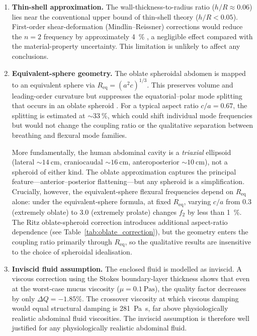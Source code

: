 \begin{enumerate}
  \item \textbf{Thin-shell approximation.}  The wall-thickness-to-radius
    ratio ($h/R \approx 0.06$) lies near the conventional upper bound of
    thin-shell theory ($h/R < 0.05$).  First-order shear-deformation
    (Mindlin--Reissner) corrections would reduce the $n = 2$ frequency by
    approximately \SI{4}{\percent} \cite{Soedel2004}, a negligible effect
    compared with the material-property uncertainty.  This limitation is
    unlikely to affect any conclusions.

  \item \textbf{Equivalent-sphere geometry.}  The oblate spheroidal
    abdomen is mapped to an equivalent sphere via $R_{\mathrm{eq}} =
    (a^2 c)^{1/3}$.  This preserves volume and leading-order curvature
    but suppresses the equatorial--polar mode splitting that occurs in
    an oblate spheroid \cite{Leissa1973}.  For a typical aspect ratio
    $c/a = 0.67$, the splitting is estimated at ${\sim}\SI{33}{\percent}$,
    which could shift individual mode frequencies but would not change the
    coupling ratio or the qualitative separation between breathing and
    flexural mode families.

    More fundamentally, the human abdominal cavity is a \emph{triaxial}
    ellipsoid (lateral ${\sim}\SI{14}{\centi\metre}$, craniocaudal
    ${\sim}\SI{16}{\centi\metre}$, anteroposterior
    ${\sim}\SI{10}{\centi\metre}$), not a spheroid of either kind.  The
    oblate approximation captures the principal feature---anterior--posterior
    flattening---but any spheroid is a simplification.  Crucially, however,
    the equivalent-sphere flexural frequencies depend on $R_{\mathrm{eq}}$
    alone: under the equivalent-sphere formula, at fixed $R_{\mathrm{eq}}$,
    varying $c/a$ from 0.3 (extremely oblate) to 3.0 (extremely prolate)
    changes $f_2$ by less than \SI{1}{\percent}.  The Ritz oblate-spheroid
    correction introduces additional aspect-ratio dependence (see
    Table~\ref{tab:oblate_correction}), but the geometry enters the coupling
    ratio primarily through $R_{\mathrm{eq}}$, so the qualitative results
    are insensitive to the choice of spheroidal idealisation.

  \item \textbf{Inviscid fluid assumption.}  The enclosed fluid is modelled
    as inviscid.  A viscous correction using the Stokes boundary-layer
    thickness shows that even at the worst-case mucus viscosity
    ($\mu = \SI{0.1}{\pascal\second}$), the quality factor decreases by only
    $\Delta Q = -1.85\%$.  The crossover viscosity at which viscous damping
    would equal structural damping is \SI{281}{\pascal\second}, far above
    physiologically realistic abdominal fluid viscosities.  The inviscid assumption is therefore
    well justified for any physiologically realistic abdominal fluid.


\end{enumerate}
